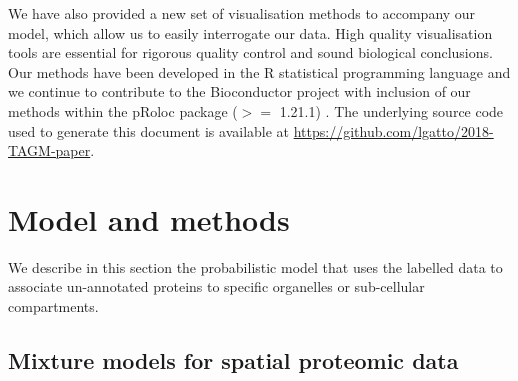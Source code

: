 \documentclass[12pt,english]{article}\usepackage[]{graphicx}\usepackage[]{color}
\begin{document}
We have also provided a new set of visualisation methods to accompany
our model, which allow us to easily interrogate our data. High quality
visualisation tools are essential for rigorous quality control and
sound biological conclusions.  Our methods have been developed in the
R statistical programming language and we continue to contribute to
the Bioconductor project \citep{Bioconductor::2004, Huber::2015} with
inclusion of our methods within the pRoloc package ($>=$ 1.21.1)
\citep{pRoloc:2014}. The underlying source code used to generate this
document is available at
\url{https://github.com/lgatto/2018-TAGM-paper}.

\bigskip


{\color{black}{Currently, our model does not integrate localisation information
from different data sources, nor does it explicitly model proteins with multiple
localisation. However, one (of many) biological explanations for the uncertainty
that we model in the allocation probabilities is provided by multiple localisation.
Thus a protein for which it is uncertain to which two sub-cellular niches it is
resident within it is perhaps resident of both niches. In further work, we plan
to explicitly model such cases to deconvolute different sources of uncertainty.
In addition, extensions to semi-supervised non-parametric methods are under
consideration to detect novel sub-cellular niches. These are the subjects of further work.
}}


\bigskip

\section*{Model and methods}\label{section:methods}

We describe in this section the probabilistic model that uses the
labelled data to associate un-annotated proteins to specific
organelles or sub-cellular compartments.

\subsection*{Mixture models for spatial proteomic data}
\end{document}
